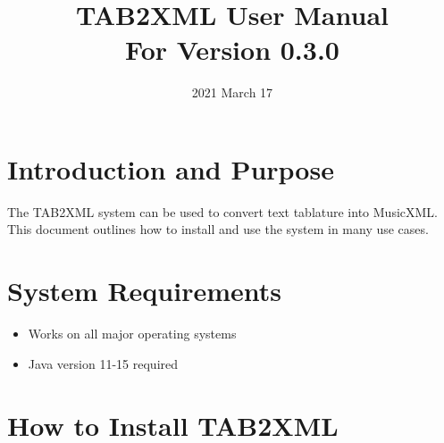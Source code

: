 \documentclass[11pt]{article}
\date{2021 March 17}
\title{TAB2XML User Manual\\\medskip
\large For Version 0.3.0}
\begin{document}
\maketitle
\tableofcontents

\newpage

\section{Introduction and Purpose}
\label{sec:org1e66370}
The TAB2XML system can be used to convert text tablature into MusicXML.  This document outlines how to install and use the system in many use cases.
\section{System Requirements}
\label{sec:org5675b18}
\begin{itemize}
\item Works on all major operating systems
\item Java version 11-15 required
\end{itemize}
\section{How to Install TAB2XML}
\label{sec:org92d7f96}
\end{document}
